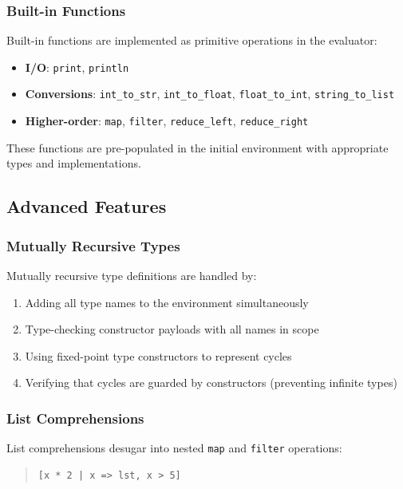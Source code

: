 \documentclass[conference,onecolumn]{IEEEtran}
\begin{document}
\subsubsection{Built-in Functions}

Built-in functions are implemented as primitive operations in the evaluator:

\begin{itemize}
\item \textbf{I/O}: \texttt{print}, \texttt{println}
\item \textbf{Conversions}: \texttt{int\_to\_str}, \texttt{int\_to\_float}, \texttt{float\_to\_int}, \texttt{string\_to\_list}
\item \textbf{Higher-order}: \texttt{map}, \texttt{filter}, \texttt{reduce\_left}, \texttt{reduce\_right}
\end{itemize}

These functions are pre-populated in the initial environment with appropriate types and implementations.

\subsection{Advanced Features}

\subsubsection{Mutually Recursive Types}

Mutually recursive type definitions are handled by:
\begin{enumerate}
\item Adding all type names to the environment simultaneously
\item Type-checking constructor payloads with all names in scope
\item Using fixed-point type constructors to represent cycles
\item Verifying that cycles are guarded by constructors (preventing infinite types)
\end{enumerate}

\subsubsection{List Comprehensions}

List comprehensions desugar into nested \texttt{map} and \texttt{filter} operations:

\begin{quote}
\small
\begin{verbatim}
[x * 2 | x => lst, x > 5]
\end{verbatim}
\end{quote}
\end{document}
